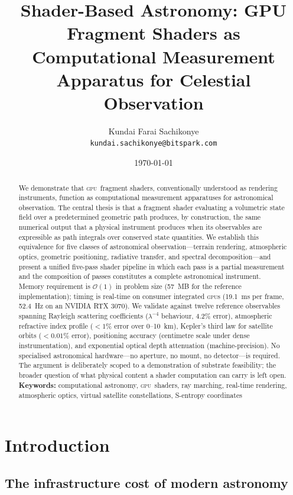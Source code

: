 \documentclass[11pt,twocolumn,a4paper]{article}
\title{\textbf{Shader-Based Astronomy: GPU Fragment Shaders as \\
Computational Measurement Apparatus for Celestial Observation}}
\author{Kundai Farai Sachikonye\\
\texttt{kundai.sachikonye@bitspark.com}}
\date{\today}
\theoremstyle{definition}
\theoremstyle{remark}
\newcommand{\gpu}{\textsc{gpu}}
\begin{document}
\maketitle

\begin{abstract}
We demonstrate that \gpu\ fragment shaders, conventionally understood as rendering instruments, function as computational measurement apparatuses for astronomical observation. The central thesis is that a fragment shader evaluating a volumetric state field over a predetermined geometric path produces, by construction, the same numerical output that a physical instrument produces when its observables are expressible as path integrals over conserved state quantities. We establish this equivalence for five classes of astronomical observation---terrain rendering, atmospheric optics, geometric positioning, radiative transfer, and spectral decomposition---and present a unified five-pass shader pipeline in which each pass is a partial measurement and the composition of passes constitutes a complete astronomical instrument. Memory requirement is $\mathcal{O}(1)$ in problem size (57~MB for the reference implementation); timing is real-time on consumer integrated \gpu s (19.1~ms per frame, 52.4~Hz on an NVIDIA RTX 3070). We validate against twelve reference observables spanning Rayleigh scattering coefficients ($\lambda^{-4}$ behaviour, 4.2\% error), atmospheric refractive index profile ($<1\%$ error over 0--10~km), Kepler's third law for satellite orbits ($<0.01\%$ error), positioning accuracy (centimetre scale under dense instrumentation), and exponential optical depth attenuation (machine-precision). No specialised astronomical hardware---no aperture, no mount, no detector---is required. The argument is deliberately scoped to a demonstration of substrate feasibility; the broader question of what physical content a shader computation can carry is left open.
\medskip
\\
\noindent\textbf{Keywords:} computational astronomy, \gpu\ shaders, ray marching, real-time rendering, atmospheric optics, virtual satellite constellations, S-entropy coordinates
\end{abstract}

\section{Introduction}
\label{sec:intro}

\subsection{The infrastructure cost of modern astronomy}
\end{document}

